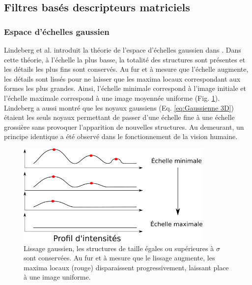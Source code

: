 \subsection{Filtres basés descripteurs matriciels}
\subsubsection{Espace d'échelles gaussien}
\label{sec:EA:rehaussement:echelle:gaussien}
Lindeberg et al. introduit la théorie de l'espace d'échelles gaussien dans \cite{Lindeberg1994_scale}. Dans cette théorie, à l'échelle la plus basse, la totalité des structures sont présentes et les détails les plus fins sont conservés. Au fur et à mesure que l'échelle augmente, les détails sont lissés pour ne laisser que les maxima locaux correspondant aux formes les plus grandes. Ainsi, l'échelle minimale correspond à l'image initiale et l'échelle maximale correspond à une image moyennée uniforme (Fig. \ref{fig:gaussian_smoothing}). Lindeberg a aussi montré que les noyaux gaussiens (Eq. \ref{eq:Gaussienne 3D}) étaient les seuls noyaux permettant de passer d'une échelle fine à une échelle grossière sans provoquer l'apparition de nouvelles structures. Au demeurant, un principe identique a été observé dans le fonctionnement de la vision humaine.
\begin{figure}[!ht]
  \centering
  \includegraphics[height=5cm]{Images/gaussian_smoothing.png}
  \caption{Lissage gaussien, les structures de taille égales ou supérieures à $\sigma$ sont conservées. Au fur et à mesure que le lissage augmente, les maxima locaux (rouge) disparaissent progressivement, laissant place à une image uniforme.}
  \label{fig:gaussian_smoothing}
\end{figure}
